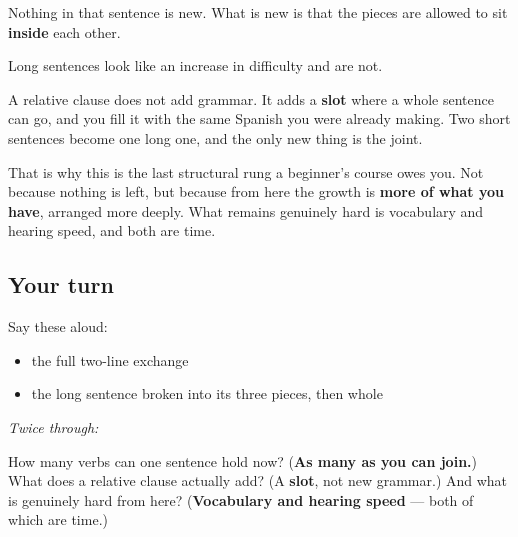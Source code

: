 Nothing in that sentence is new. What is new is that the pieces are allowed to sit \textbf{inside} each other.

\begin{grammarlens}[title={Grammar Lens: length is not difficulty}]
Long sentences look like an increase in difficulty and are not.

A relative clause does not add grammar. It adds a \textbf{slot} where a whole sentence can go, and you fill it with the same Spanish you were already making. Two short sentences become one long one, and the only new thing is the joint.

That is why this is the last structural rung a beginner's course owes you. Not because nothing is left, but because from here the growth is \textbf{more of what you have}, arranged more deeply. What remains genuinely hard is vocabulary and hearing speed, and both are time.
\end{grammarlens}

\subsection*{Your turn}
Say these aloud:

\begin{itemize}
\raggedright
  \item the full two-line exchange
  \item the long sentence broken into its three pieces, then whole
\end{itemize}

\emph{Twice through:}

\begin{tcolorbox}[breakable,colback=teal!4,colframe=teal!35!black,title={Before you move on}]
How many verbs can one sentence hold now? (\textbf{As many as you can join.}) What does a relative clause actually add? (A \textbf{slot}, not new grammar.) And what is genuinely hard from here? (\textbf{Vocabulary and hearing speed} — both of which are time.)
\end{tcolorbox}
